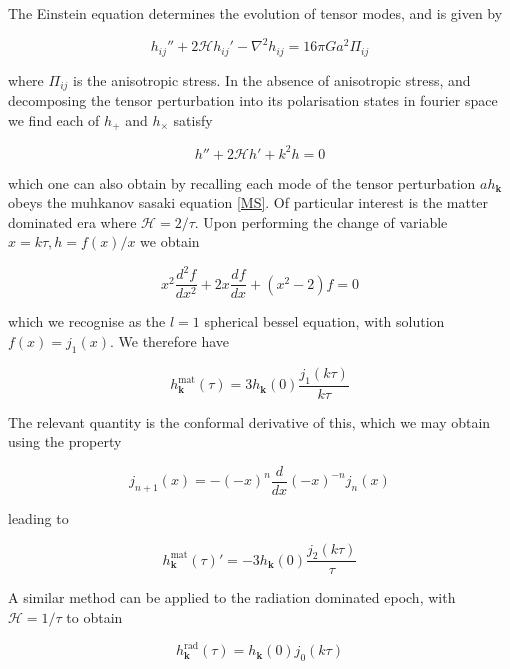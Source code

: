 \documentclass[a4paper,10pt]{article}
\renewcommand{\v}[1]{\mathbf{#1}}
\begin{document}
The Einstein equation determines the evolution of tensor modes, and is given by \cite{Pritchard}

\begin{equation}
h_{ij}''+2\mathcal{H}h_{ij}'-\nabla^2h_{ij} = 16\pi Ga^2\Pi_{ij}
\end{equation}

where $\Pi_{ij}$ is the anisotropic stress. In the absence of anisotropic stress, and decomposing the tensor perturbation into its polarisation states in fourier space we find each of $h_+$ and $h_\times$ satisfy

\begin{equation}
h''+2\mathcal{H}h'+k^2h = 0
\end{equation}

which one can also obtain by recalling each mode of the tensor perturbation $ah_\v{k}$ obeys the muhkanov sasaki equation \ref{MS}.  Of particular interest is the matter dominated era where $\mathcal{H}=2/\tau$. Upon performing the change of variable $x=k\tau,  h=f(x)/x$ we obtain

\begin{equation}
x^2\frac{d^2f}{dx^2}+2x\frac{df}{dx}+(x^2-2)f=0
\end{equation}

which we recognise as the $l=1$ spherical bessel equation, with solution $f(x) = j_1(x)$. We therefore have

\begin{equation}
h^{\text{mat}}_\v{k}(\tau) = 3h_\v{k}(0)\frac{j_1(k\tau)}{k\tau}
\end{equation}

The relevant quantity is the conformal derivative of this, which we may obtain using the property

\begin{equation}
j_{n+1}(x)=-(-x)^n\frac{d}{dx}(-x)^{-n}j_n(x)
\end{equation}

leading to 

\begin{equation}
h^{\text{mat}}_\v{k}(\tau)' = -3h_\v{k}(0)\frac{j_2(k\tau)}{\tau}
\end{equation}

A similar method can be applied to the radiation dominated epoch, with $\mathcal{H}=1/\tau$ to obtain

\begin{equation}
h^{\text{rad}}_\v{k}(\tau) = h_\v{k}(0)j_0({k\tau})
\end{equation}
\end{document}

